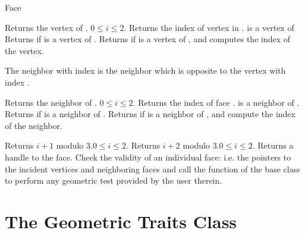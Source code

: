 \begin{ccClass} {Face}

{Returns  the vertex  of \ccVar.
\ccPrecond $0\leq i \leq 2$.}
\ccGlue
{}
{Returns the index of vertex  in \ccVar. \ccPrecond {} is
a vertex of \ccVar}
\ccGlue
{}
{Returns  if   is a vertex of \ccVar.}
\ccGlue
{}
{Returns  if   is a vertex of \ccVar, and
 computes the index  of the vertex.}




The neighbor with index  is the neighbor which is opposite
to the vertex with index .


{Returns  the neighbor  of \ccVar.
\ccPrecond $0\leq i \leq 2$.
}
\ccGlue
{}
{Returns the index of face .
\ccPrecond {} is a neighbor of \ccVar.}
\ccGlue
{}
{Returns  if  is a neighbor of \ccVar.}
\ccGlue
{}
{Returns  if  is a neighbor of \ccVar,  and
compute the index  of the neighbor.}

%


 
{Returns $i+1$ modulo 3.\ccPrecond $0\leq i \leq 2$.}
\ccGlue
{}
{Returns $i+2$ modulo 3.\ccPrecond $0\leq i \leq 2$.}
\ccGlue
{}
{Returns a handle to the face.}
\ccGlue
{} 
{Check the validity of an individual face:
i.e. the pointers to the incident vertices
and neighboring faces
 and call the 
function of the base class to perform any geometric test provided by the user
therein.}

\end{ccClass}


\section{ The Geometric Traits Class}
\label{I1_Sect_Geom_traits}

